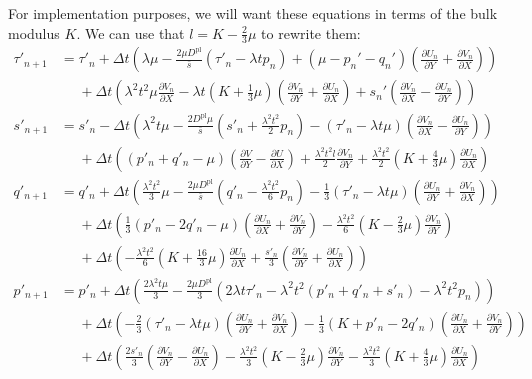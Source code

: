\documentclass[11pt]{article}
\newcommand{\p}{\partial}
\newcommand{\Dpl}{D^\text{pl}}
\begin{document}
For implementation purposes, we will want these equations in terms of the bulk modulus $K$. We can use that $l = K - \frac{2}{3}\mu$ to rewrite them:
\begin{align}
    \tau'_{n+1} &= \tau'_n + \Delta t \left(\lambda \mu - \frac{2\mu\Dpl}{\bar{s}}(\tau'_n - \lambda t p_n) + (\mu - p_n' - q_n')\left(\frac{\p U_n}{\p Y} + \frac{\p V_n}{\p X}\right)\right) \nonumber \\
    &\phantom{=} + \Delta t\left(\lambda^2 t^2 \mu \frac{\p V_n}{\p X} - \lambda t \left(K + \frac{1}{3}\mu\right)\left(\frac{\p V_n}{\p Y} + \frac{\p U_n}{\p X}\right) + s_n'\left(\frac{\p V_n}{\p X} - \frac{\p U_n}{\p Y}\right)\right)\\
%
    s'_{n+1} &=  s'_n - \Delta t \left(\lambda^2 t \mu - \frac{2\Dpl\mu}{\bar{s}}\left(s'_n + \frac{\lambda^2 t^2}{2}p_n\right) - \left(\tau'_n - \lambda t \mu\right)\left(\frac{\p V_n}{\p X} - \frac{\p U_n}{\p Y}\right)\right)\nonumber\\
    &\phantom{=} + \Delta t\left(\left(p'_n + q'_n - \mu\right)\left(\frac{\p V}{\p Y} - \frac{\p U}{\p X}\right) + \frac{\lambda^2 t^2 l}{2}\frac{\p V_n}{\p Y} + \frac{\lambda^2 t^2}{2}\left(K + \frac{4}{3}\mu\right)\frac{\p U_n}{\p X}\right)\\
%
    q'_{n+1} &= q'_n + \Delta t \left(\frac{\lambda^2 t^2}{3}\mu - \frac{2\mu\Dpl}{\bar{s}}\left(q'_n - \frac{\lambda^2 t^2}{6}p_n\right) - \frac{1}{3}(\tau'_n - \lambda t \mu)\left(\frac{\p U_n}{\p Y} + \frac{\p V_n}{\p X}\right)  \right)\nonumber\\
    &\phantom{=} + \Delta t \left(\frac{1}{3}\left(p'_n - 2q'_n - \mu\right)\left(\frac{\p U_n}{\p X} + \frac{\p V_n}{\p Y}\right) - \frac{\lambda^2 t^2}{6}\left(K - \frac{2}{3}\mu\right)\frac{\p V_n}{\p Y}\right)\nonumber\\
    &\phantom{=} + \Delta t\left(-\frac{\lambda^2t^2}{6}\left(K + \frac{16}{3}\mu\right)\frac{\p U_n}{\p X} + \frac{s'_n}{3}\left(\frac{\p V_n}{\p Y} + \frac{\p U_n}{\p X}\right)\right)\\
%
    p'_{n+1} &= p'_n + \Delta t \left(\frac{2\lambda^2 t \mu}{3} - \frac{2\mu\Dpl}{3}(2\lambda t \tau'_n - \lambda^2 t^2 (p'_n + q'_n + s'_n) - \lambda^2 t^2 p_n)\right)\nonumber\\
    &\phantom{=} + \Delta t\left(-\frac{2}{3}(\tau'_n - \lambda t \mu)\left(\frac{\p U_n}{\p Y} + \frac{\p V_n}{\p X}\right) - \frac{1}{3}(K + p'_n - 2q'_n)\left(\frac{\p U_n}{\p X} + \frac{\p V_n}{\p Y}\right)\right)\nonumber\\
    &\phantom{=} + \Delta t\left(\frac{2s'_n}{3}\left(\frac{\p V_n}{\p Y} - \frac{\p U_n}{\p X}\right) - \frac{\lambda^2 t^2}{3}\left(K - \frac{2}{3}\mu\right)\frac{\p V_n}{\p Y} - \frac{\lambda^2t^2}{3}\left(K + \frac{4}{3}\mu\right)\frac{\p U_n}{\p X}\right)
    \label{eqn:sshear_stress_explicit_bulk}
\end{align}
\end{document}
